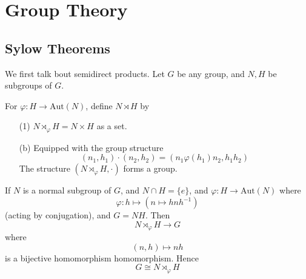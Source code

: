 



\chapter{Group Theory}




\section{Sylow Theorems}
We first talk bout semidirect products. Let $G$ be any group, and $N,H$ be subgroups of $G$.
\begin{defn}
For $\varphi:H\to\text{Aut}(N)$, define $N\rtimes H$ by 
\begin{itemize}
    \item[(1)] $N\rtimes_\varphi H=N\times H$ as a set.
    \item[(b)] Equipped with the group structure 
    \begin{equation*}
        (n_1,h_1)\cdot (n_2,h_2)=(n_1\varphi(h_1)n_2, h_1h_2)
    \end{equation*}
    The structure $(N\rtimes_\varphi H, \cdot)$ forms a group. 
\end{itemize}
\end{defn}

\begin{example}
    If $N$ is a normal subgroup of $G$, and $N\cap H=\{e\}$, and $\varphi:H\to\text{Aut}(N)$ where 
    \begin{equation*}
        \varphi: h\mapsto (n\mapsto hnh^{-1})
    \end{equation*}
    (acting by conjugation), and $G=NH$. Then 
    \begin{equation*}
        N\rtimes_\varphi H\to G
    \end{equation*}
    where 
    \begin{equation*}
        (n,h)\mapsto nh
    \end{equation*}
    is a bijective homomorphism homomorphism. Hence 
    \begin{equation*}
        G\cong N\rtimes_\varphi H
    \end{equation*}
\end{example}

